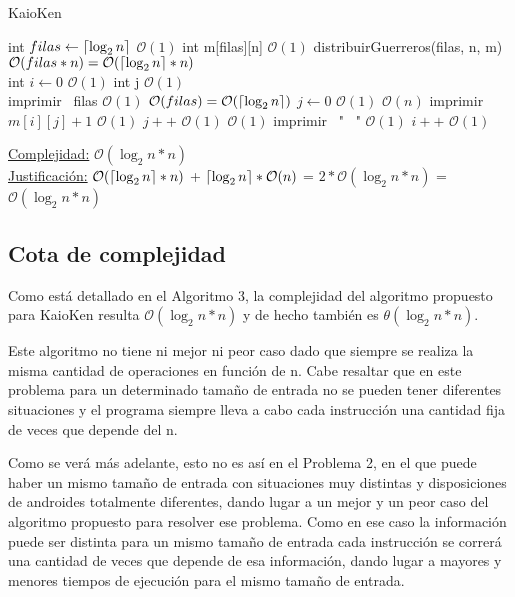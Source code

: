 \documentclass[10pt,a4paper]{article}
\DeclarePairedDelimiter\ceil{\lceil}{\rceil}
\begin{document}
\begin{algorithm}
\caption{KaioKen}
\begin{algorithmic}
	\State int $filas \gets \ceil*{\log_2 n}$ \Comment $\mathcal{O}(1)$
	\State int m[filas][n] \Comment $\mathcal{O}(1)$
	\State distribuirGuerreros(filas, n, m) \Comment $\mathcal{O}(filas*n) = \mathcal{O}(\ceil*{\log_2 n}*n)$
	\\
	\State int $i \gets 0$ \Comment $\mathcal{O}(1)$
	\State int j \Comment $\mathcal{O}(1)$
	\\
	\State imprimir ~filas \Comment $\mathcal{O}(1)$
	 \Comment $\mathcal{O}(filas) = \mathcal{O}(\ceil*{\log_2 n})$
		\State $j \gets 0$ \Comment $\mathcal{O}(1)$
		 \Comment $\mathcal{O}(n)$
			\State imprimir ~$m[i][j]+1$ \Comment $\mathcal{O}(1)$
			\State $j++$ \Comment $\mathcal{O}(1)$
			 \Comment $\mathcal{O}(1)$
				\State imprimir ~"~ " \Comment $\mathcal{O}(1)$
			\EndIf
		\EndWhile
		\State $i++$ \Comment $\mathcal{O}(1)$
	\EndWhile
\EndFunction
\end{algorithmic}
\underline{Complejidad:} $\mathcal{O}(\log _{2} n * n)$\\
    \underline{Justificación:} $ \mathcal{O}(\ceil*{\log_2 n}*n)$ + $ \ceil*{\log_2 n} * \mathcal{O}(n)$ = $2*\mathcal{O}(\log _{2} n * n)$ = $\mathcal{O}(\log _{2} n * n)$\\
\end{algorithm}


\newpage
\subsection{Cota de complejidad}
\par{Como está detallado en el Algoritmo 3, la complejidad del algoritmo propuesto para KaioKen resulta $\mathcal{O}(\log _{2} n * n)$ y de hecho también es $\mathcal{\theta}(\log _{2} n * n)$}.
\par{Este algoritmo no tiene ni mejor ni peor caso dado que siempre se realiza la misma cantidad de operaciones en función de n. Cabe resaltar que en este problema para un determinado tamaño de entrada no se pueden tener diferentes situaciones y el programa siempre lleva a cabo cada instrucción una cantidad fija de veces que depende del n.}
\par{Como se verá más adelante, esto no es así en el Problema 2, en el que puede haber un mismo tamaño de entrada con situaciones muy distintas y disposiciones de androides totalmente diferentes, dando lugar a un mejor y un peor caso del algoritmo propuesto para resolver ese problema. Como en ese caso la información puede ser distinta para un mismo tamaño de entrada cada instrucción se correrá una cantidad de veces que depende de esa información, dando lugar a mayores y menores tiempos de ejecución para el mismo tamaño de entrada.}
\end{document}
